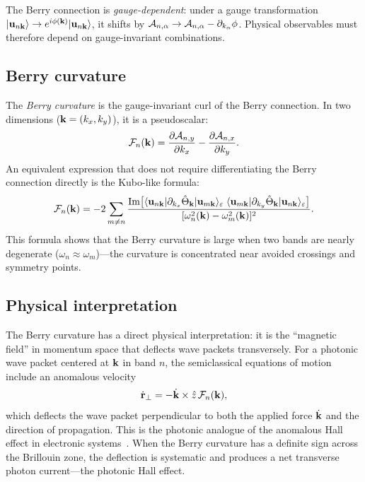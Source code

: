 The Berry connection is \emph{gauge-dependent}: under a gauge
transformation $|\mathbf{u}_{n\mathbf{k}}\rangle \to e^{i\phi(\mathbf{k})}|\mathbf{u}_{n\mathbf{k}}\rangle$,
it shifts by $\mathcal{A}_{n,\alpha} \to \mathcal{A}_{n,\alpha} - \partial_{k_\alpha}\phi$. Physical
observables must therefore depend on gauge-invariant combinations.

\subsection{Berry curvature}
\label{ssec:berry-curvature}

The \emph{Berry curvature} is the gauge-invariant curl of the Berry
connection. In two dimensions ($\mathbf{k} = (k_x,k_y)$), it is a
pseudoscalar:
\begin{equation}
 \mathcal{F}_n(\mathbf{k}) = \frac{\partial \mathcal{A}_{n,y}}{\partial k_x} - \frac{\partial \mathcal{A}_{n,x}}{\partial k_y}.
 \label{eq:berry-curvature-2d}
\end{equation}
An equivalent expression that does not require differentiating the
Berry connection directly is the Kubo-like formula:
\begin{equation}
 \mathcal{F}_n(\mathbf{k}) = -2\sum_{m\neq n}
 \frac{\operatorname{Im}\bigl[
 \langle\mathbf{u}_{n\mathbf{k}}|\partial_{k_x}\hat{\Theta}_{\mathbf{k}}|\mathbf{u}_{m\mathbf{k}}\rangle_\varepsilon
 \;\langle\mathbf{u}_{m\mathbf{k}}|\partial_{k_y}\hat{\Theta}_{\mathbf{k}}|\mathbf{u}_{n\mathbf{k}}\rangle_\varepsilon
 \bigr]}
 {[\omega_n^2(\mathbf{k}) - \omega_m^2(\mathbf{k})]^2}.
 \label{eq:berry-curvature-kubo}
\end{equation}
This formula shows that the Berry curvature is large when two bands
are nearly degenerate ($\omega_n \approx \omega_m$)---the curvature is
concentrated near avoided crossings and symmetry points.

\subsection{Physical interpretation}
\label{ssec:berry-physics}

The Berry curvature has a direct physical interpretation: it is the
``magnetic field'' in momentum space that deflects wave packets
transversely. For a photonic wave packet centered at $\mathbf{k}$ in band $n$,
the semiclassical equations of motion include an anomalous velocity
\begin{equation}
 \dot{\mathbf{r}}_{\perp} = -\dot{\mathbf{k}}\times\hat{z}\,\mathcal{F}_n(\mathbf{k}),
 \label{eq:anomalous-velocity}
\end{equation}
which deflects the wave packet perpendicular to both the applied force
$\dot{\mathbf{k}}$ and the direction of propagation. This is the photonic
analogue of the anomalous Hall effect in electronic systems~\cite{skirlo2015experimental,wu2015scheme,noh2017observation,chen2018valley,gao2017topologically,kang2018pseudo,he2019silicon,tan2021scheme,ma2017scattering,hui2021photonic}. When the
Berry curvature has a definite sign across the Brillouin zone, the
deflection is systematic and produces a net transverse photon current---the
photonic Hall effect.

